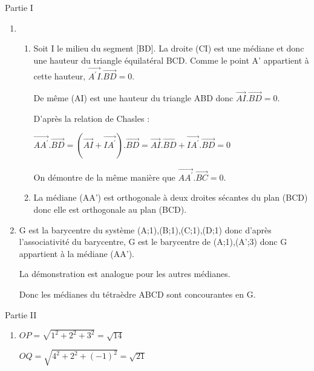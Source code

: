 \begin{corrige}
     \begin{h3} Partie I \end{h3}
     \begin{enumerate}
          \item
          \begin{enumerate}[label=\alph*.]
               \item
               Soit I le milieu du segment [BD]. La droite (CI) est une médiane et donc une hauteur du triangle équilatéral BCD. Comme le point A' appartient à cette hauteur, $\overrightarrow{A^{\prime}I}.\overrightarrow{BD}=0$.
               \par
               De même (AI) est une hauteur du triangle ABD donc $\overrightarrow{AI}.\overrightarrow{BD}=0$.
               \par
               D'après la relation de Chasles :
               \par
               $\overrightarrow{AA^{\prime}}.\overrightarrow{BD}=\left(\overrightarrow{AI}+\overrightarrow{IA^{\prime}}\right).\overrightarrow{BD}=\overrightarrow{AI}.\overrightarrow{BD}+\overrightarrow{IA^{\prime}}.\overrightarrow{BD}=0$
               \par
               On démontre de la même manière que $\overrightarrow{AA^{\prime}}.\overrightarrow{BC}=0$.
               \item
               La médiane (AA') est orthogonale à deux droites sécantes du plan (BCD) donc elle est orthogonale au plan (BCD).
          \end{enumerate}
          \item
          G est la barycentre du système {(A;1),(B;1),(C;1),(D;1)} donc d'après l'associativité du barycentre, G est le barycentre de {(A;1),(A';3)} donc G appartient à la médiane (AA').
          \par
          La démonstration est analogue pour les autres médianes.
          \par
          Donc les médianes du tétraèdre ABCD sont concourantes en G.
     \end{enumerate}
     \begin{h3} Partie II \end{h3}
     \begin{enumerate}
          \item
          $OP=\sqrt{1^{2}+2^{2}+3^{2}}=\sqrt{14}$
          \par
          $OQ=\sqrt{4^{2}+2^{2}+\left(-1\right)^{2}}=\sqrt{21}$

\end{enumerate}
\end{corrige}
